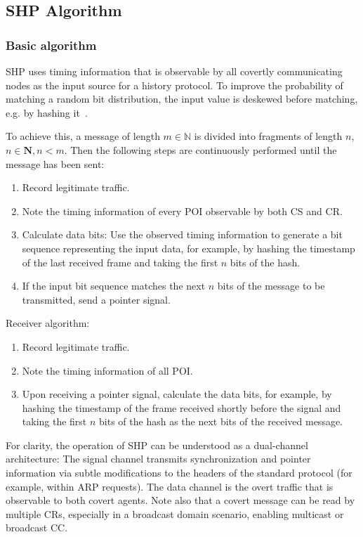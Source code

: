 \documentclass[journal]{IEEEtran}
\begin{document}
\subsection{SHP Algorithm}
\label{sec:SHP_algorithm}

\subsubsection{Basic algorithm}

\ac{SHP} uses timing information that is observable by all covertly communicating nodes as the input source for a history protocol. To improve the probability of matching a random bit distribution, the input value is deskewed before matching, e.g. by hashing it~\cite{cachin98}.

To achieve this, a message of length $m \in \mathbb{N}$ is divided into fragments of length $n$, $n \in \mathbf{N}, n<m$. Then the following steps are continuously performed until the message has been sent:
\begin{enumerate}
    \item Record legitimate traffic.
    \item Note the timing information of every \ac{POI} observable by both \ac{CS} and \ac{CR}. 
    \item Calculate data bits: Use the observed timing information to generate a bit sequence representing the input data, for example, by hashing the timestamp of the last received frame and taking the first $n$ bits of the hash.
    \item If the input bit sequence matches the next $n$ bits of the message to be transmitted, send a pointer signal.
\end{enumerate}

Receiver algorithm:
\begin{enumerate}
    \item Record legitimate traffic.
    \item Note the timing information of all \ac{POI}.
    \item Upon receiving a pointer signal, calculate the data bits, for example, by hashing the timestamp of the frame received shortly before the signal and taking the first $n$ bits of the hash as the next bits of the received message.
\end{enumerate}

For clarity, the operation of \ac{SHP} can be understood as a dual-channel architecture: The signal channel transmits synchronization and pointer information via subtle modifications to the headers of the standard protocol (for example, within \ac{ARP} requests). The data channel is the overt traffic that is observable to both covert agents. Note also that a covert message can be read by multiple \ac{CR}s, especially in a broadcast domain scenario, enabling multicast or broadcast \ac{CC}.
\end{document}
